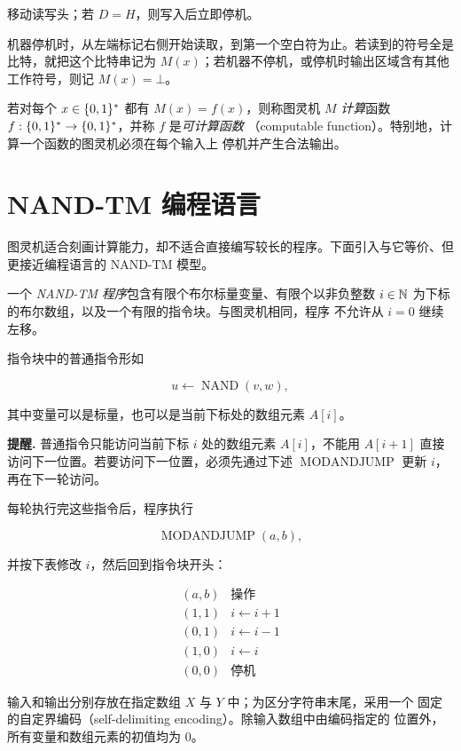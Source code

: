 移动读写头；若 $D=H$，则写入后立即停机。

机器停机时，从左端标记右侧开始读取，到第一个空白符为止。若读到的符号全是
比特，就把这个比特串记为 $M(x)$；若机器不停机，或停机时输出区域含有其他
工作符号，则记 $M(x)=\bot$。

\begin{definition}[可计算函数]
  \label{def:computable-function}
  若对每个 $x\in\{0,1\}^{*}$ 都有 $M(x)=f(x)$，则称图灵机 $M$
  \emph{计算}函数 $f:\{0,1\}^{*}\to\{0,1\}^{*}$，并称 $f$ 是\emph{可计算函数}
  （computable function）。特别地，计算一个函数的图灵机必须在每个输入上
  停机并产生合法输出。
\end{definition}

\section{NAND-TM 编程语言}

图灵机适合刻画计算能力，却不适合直接编写较长的程序。下面引入与它等价、但
更接近编程语言的 NAND-TM 模型。

\begin{definition}[NAND-TM 程序]
  \label{def:nand-tm}
  一个 \emph{NAND-TM 程序}包含有限个布尔标量变量、有限个以非负整数
  $i\in\mathbb{N}$ 为下标的布尔数组，以及一个有限的指令块。与图灵机相同，程序
  不允许从 $i=0$ 继续左移。

  指令块中的普通指令形如

  \[
    u\gets\operatorname{NAND}(v,w),
  \]

  其中变量可以是标量，也可以是当前下标处的数组元素 $A[i]$。

  \textbf{提醒.}
  普通指令只能访问当前下标 $i$ 处的数组元素 $A[i]$，不能用 $A[i+1]$
  直接访问下一位置。若要访问下一位置，必须先通过下述
  $\operatorname{MODANDJUMP}$ 更新 $i$，再在下一轮访问。

  每轮执行完这些指令后，程序执行

  \[
    \operatorname{MODANDJUMP}(a,b),
  \]

  并按下表修改 $i$，然后回到指令块开头：

  \[
    \begin{array}{c|c}
      (a,b)&\text{操作}\\ \hline
      (1,1)&i\gets i+1\\
      (0,1)&i\gets i-1\\
      (1,0)&i\gets i\\
      (0,0)&\text{停机}
    \end{array}
  \]

  输入和输出分别存放在指定数组 $X$ 与 $Y$ 中；为区分字符串末尾，采用一个
  固定的自定界编码（self-delimiting encoding）。除输入数组中由编码指定的
 位置外，所有变量和数组元素的初值均为 $0$。
\end{definition}

